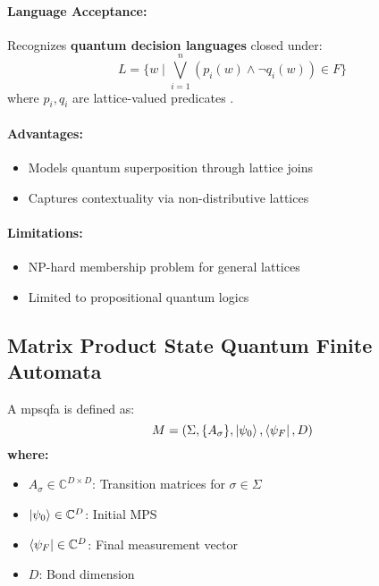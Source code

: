 \paragraph{Language Acceptance:}
Recognizes \textbf{quantum decision languages} closed under:
\[
L = \{w \mid \bigvee_{i=1}^n (p_i(w) \land \neg q_i(w)) \in F\}
\]
where $p_i,q_i$ are lattice-valued predicates \cite{gudder1978quantum}.

\paragraph{Advantages:}
\begin{itemize}
    \item Models quantum superposition through lattice joins
    \item Captures contextuality via non-distributive lattices
\end{itemize}

\paragraph{Limitations:}
\begin{itemize}
    \item NP-hard membership problem for general lattices
    \item Limited to propositional quantum logics
\end{itemize}

\subsection{Matrix Product State Quantum Finite Automata}
\label{subsec:mpsqfa}

\begin{definition}
A \gls{mpsqfa} is defined as:
\[
M = (\Sigma, \{A_\sigma\}, \ket{\psi_0}, \bra{\psi_F}, D)
\]
\textbf{where:}
\begin{itemize}
    \item $A_\sigma \in \mathbb{C}^{D \times D}$: Transition matrices for $\sigma \in \Sigma$
    \item $\ket{\psi_0} \in \mathbb{C}^D$: Initial MPS
    \item $\bra{\psi_F} \in \mathbb{C}^D$: Final measurement vector
    \item $D$: Bond dimension
\end{itemize}
\end{definition}


